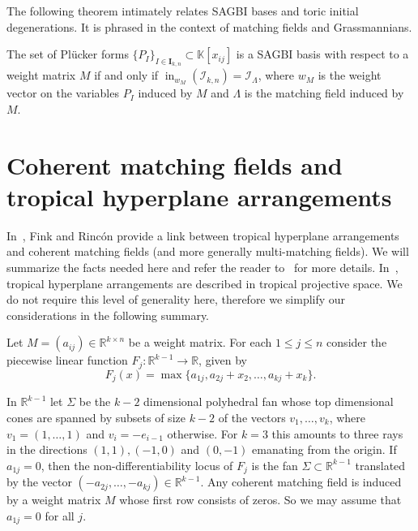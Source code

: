 \documentclass[ALCO,ThmDefs,Unicode,epreuves]{cedram}
\DeclareMathOperator{\ini}{in}
\newcommand{\I}{\mathcal{I}}
\begin{document}
The following theorem intimately relates SAGBI bases and toric initial degenerations. It is phrased in the context of matching fields and Grassmannians. 

\begin{theo}\label{Theorem:Stu}
The set of Pl{\"u}cker forms $\{P_I\}_{I\in \mathbf{I}_{k,n}}\subset \mathbb{K}[x_{ij}]$ 
is a SAGBI basis with respect to a weight matrix $M$ if and only if $\ini_{w_M}(\I_{k, n}) = \I_\Lambda$, where $w_M$ is the weight vector on the variables $P_I$ induced by $M$ and ${\Lambda}$ is the matching field induced by $M$. 
\end{theo}



\section{Coherent matching fields and tropical hyperplane arrangements}\label{sec:arr}

In~\cite{fink2015stiefel}, Fink and Rinc\'on provide a link between tropical hyperplane arrangements and coherent matching fields (and more generally multi-matching fields). We will summarize the facts needed here and refer the reader to~\cite{fink2015stiefel} for more details. In~\cite{fink2015stiefel}, tropical hyperplane arrangements are described in tropical projective space. We do not require this level of generality here, therefore we simplify our considerations in the following summary. 

Let $M=(a_{ij}) \in \mathbb{R}^{k \times n}$ be a weight matrix. For each $1 \leq j \leq n$ consider the piecewise linear function $F_j: \mathbb{R}^{k-1} \to \mathbb{R}$, given by 
 \begin{equation}\label{eqn:linearform}
 F_j (x) = \max \{ a_{1j}, a_{2j} + x_2, \ldots, a_{kj}+ x_k\}. 
 \end{equation}

In $\mathbb{R}^{k-1}$ let $\Sigma$ be the $k-2$ dimensional polyhedral fan whose top dimensional cones
are spanned by subsets of size $k-2$ of the vectors $v_1, \ldots, v_{k}$, where $v_1 = (1, \ldots, 1)$ and 
$v_i = - e_{i-1}$ otherwise. For $k=3$ this amounts to three rays in the directions $(1, 1), (-1, 0)$ and $(0, -1)$ emanating from the origin. 
If $a_{1j} = 0$, then the non-differentiability locus of $F_j$ is the fan $\Sigma \subset \mathbb{R}^{k-1}$ translated by the vector $(-a_{2j} , \ldots, -a_{kj}) \in \mathbb{R}^{k-1}$. Any coherent matching field is induced by a weight matrix $M$ whose first row consists of zeros. 
So we may assume that $a_{1j} = 0$ for all $j$.
\end{document}
